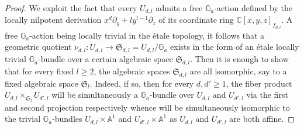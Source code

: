 \documentclass[10pt,oneside,english]{amsart}
\numberwithin{equation}{section}
\numberwithin{figure}{section}
\theoremstyle{plain}
\theoremstyle{remark}
\theoremstyle{plain}
\theoremstyle{plain}
\theoremstyle{definition}
\begin{document}
\begin{proof}
We exploit the fact that every $U_{d,l}$ admits a free $\mathbb{G}_{a}$-action
defined by the locally nilpotent derivation $x^{d}\partial_{y}+ly^{l-1}\partial_{z}$
of its coordinate ring $\mathbb{C}\left[x,y,z\right]_{f_{d,l}}$.
A free $\mathbb{G}_{a}$-action being locally trivial in the \'etale
topology, it follows that a geometric quotient $\nu_{d,l}:U_{d,l}\rightarrow\mathfrak{S}_{d,l}=U_{d,l}/\mathbb{G}_{a}$
exists in the form of an \'etale locally trivial $\mathbb{G}_{a}$-bundle
over a certain algebraic space $\mathfrak{S}_{d,l}$. Then it is enough
to show that for every fixed $l\geq2$, the algebraic spaces $\mathfrak{S}_{d,l}$
are all isomorphic, say to a fixed algebraic space $\mathfrak{S}_{l}$.
Indeed, if so, then for every $d,d'\geq1$, the fiber product $U_{d,l}\times_{\mathfrak{S}_{l}}U_{d',l}$
will be simultaneously a $\mathbb{G}_{a}$-bundle over $U_{d,l}$
and $U_{d',l}$ via the first and second projection respectively whence
will be simultaneously isomorphic to the trivial $\mathbb{G}_{a}$-bundles
$U_{d,l}\times\mathbb{A}^{1}$ and $U_{d',l}\times\mathbb{A}^{1}$
as $U_{d,l}$ and $U_{d',l}$ are both affine. 


\end{proof}
\end{document}
